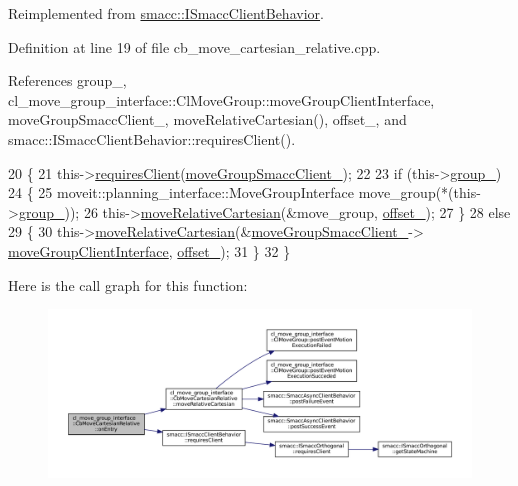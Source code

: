 Reimplemented from \hyperlink{classsmacc_1_1ISmaccClientBehavior_a3ec24a839087c550e1d62a81e48cf530}{smacc\+::\+I\+Smacc\+Client\+Behavior}.



Definition at line 19 of file cb\+\_\+move\+\_\+cartesian\+\_\+relative.\+cpp.



References group\+\_\+, cl\+\_\+move\+\_\+group\+\_\+interface\+::\+Cl\+Move\+Group\+::move\+Group\+Client\+Interface, move\+Group\+Smacc\+Client\+\_\+, move\+Relative\+Cartesian(), offset\+\_\+, and smacc\+::\+I\+Smacc\+Client\+Behavior\+::requires\+Client().


\begin{DoxyCode}
20 \{
21   this->\hyperlink{classsmacc_1_1ISmaccClientBehavior_a32b16e99e3b4cb289414203dc861a440}{requiresClient}(\hyperlink{classcl__move__group__interface_1_1CbMoveCartesianRelative_ac0226b2db9bf4de86eb64a535457e295}{moveGroupSmaccClient\_});
22 
23   \textcolor{keywordflow}{if} (this->\hyperlink{classcl__move__group__interface_1_1CbMoveCartesianRelative_a194d8357267ccd5ee0a10200f1c4cae0}{group\_})
24   \{
25       moveit::planning\_interface::MoveGroupInterface move\_group(*(this->\hyperlink{classcl__move__group__interface_1_1CbMoveCartesianRelative_a194d8357267ccd5ee0a10200f1c4cae0}{group\_}));
26       this->\hyperlink{classcl__move__group__interface_1_1CbMoveCartesianRelative_ae8443c7f81affe5c4450e83fc665487f}{moveRelativeCartesian}(&move\_group, \hyperlink{classcl__move__group__interface_1_1CbMoveCartesianRelative_aac5b6c2f42406da43f94cd5334aca925}{offset\_});
27   \}
28   \textcolor{keywordflow}{else}
29   \{
30       this->\hyperlink{classcl__move__group__interface_1_1CbMoveCartesianRelative_ae8443c7f81affe5c4450e83fc665487f}{moveRelativeCartesian}(&\hyperlink{classcl__move__group__interface_1_1CbMoveCartesianRelative_ac0226b2db9bf4de86eb64a535457e295}{moveGroupSmaccClient\_}->
      \hyperlink{classcl__move__group__interface_1_1ClMoveGroup_a92922ea689e4e1b7b91512c56629c95b}{moveGroupClientInterface}, \hyperlink{classcl__move__group__interface_1_1CbMoveCartesianRelative_aac5b6c2f42406da43f94cd5334aca925}{offset\_});
31   \}
32 \}
\end{DoxyCode}
Here is the call graph for this function\+:
\nopagebreak
\begin{figure}[H]
\begin{center}
\leavevmode
\includegraphics[width=350pt]{classcl__move__group__interface_1_1CbMoveCartesianRelative_a7d65e3d5fa3f2c7b47d9cbe631f448ad_cgraph}
\end{center}
\end{figure}
